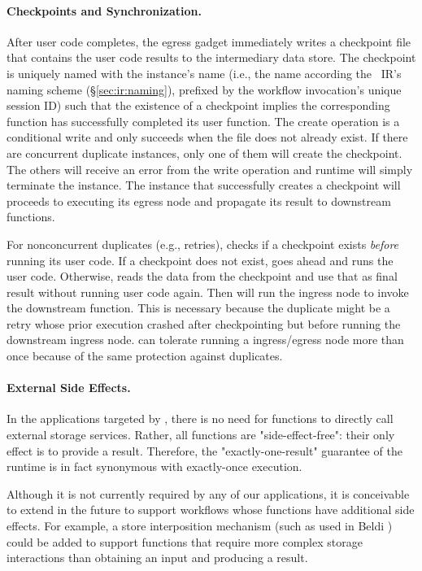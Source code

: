 \paragraph{Checkpoints and Synchronization.}
After user code completes, the \name{} egress gadget immediately writes a checkpoint file that contains the user code
results to the intermediary data store. The checkpoint is uniquely named with
the instance's name (i.e., the name according the
\name{}~IR's naming scheme (\S\ref{sec:ir:naming}), prefixed by the workflow
invocation's unique session ID) such that the existence of a checkpoint
implies the corresponding function has successfully completed its user
function. The create operation is a conditional write and only succeeds when
the file does not already exist. If there are concurrent duplicate instances,
only one of them will create the checkpoint. The others will receive an error
from the write operation and \name{} runtime will simply terminate the
instance. The instance that successfully creates a checkpoint will proceeds to
executing its egress node and propagate its result to downstream functions.

For nonconcurrent duplicates (e.g., retries), \name{} checks if a checkpoint
exists \emph{before} running its user code. If a checkpoint does not exist,
\name{} goes ahead and runs the user code. Otherwise, \name{} reads the data
from the checkpoint and use that as final result without running user code
again. Then \name{} will run the ingress node to invoke the downstream function.
This is necessary because the duplicate might be a retry whose prior execution
crashed after checkpointing but before running the downstream ingress node. \name{} can
tolerate running a ingress/egress node more than once because of the same protection
against duplicates.

\paragraph{External Side Effects.}
In the applications targeted by \name{}, there is no need for functions to directly call external storage services. 
Rather, all functions are "side-effect-free": their only effect is to provide a result.
Therefore, the "exactly-one-result" guarantee of the \name{} runtime is in fact synonymous with exactly-once execution.

Although it is not currently required by any of our applications, it is conceivable to extend \name{} in the future to support
workflows whose functions have additional side effects. For example, a store interposition mechanism (such as used in Beldi \cite{beldi}) could 
be added to support functions that require more complex storage interactions than obtaining an input and producing a result.


